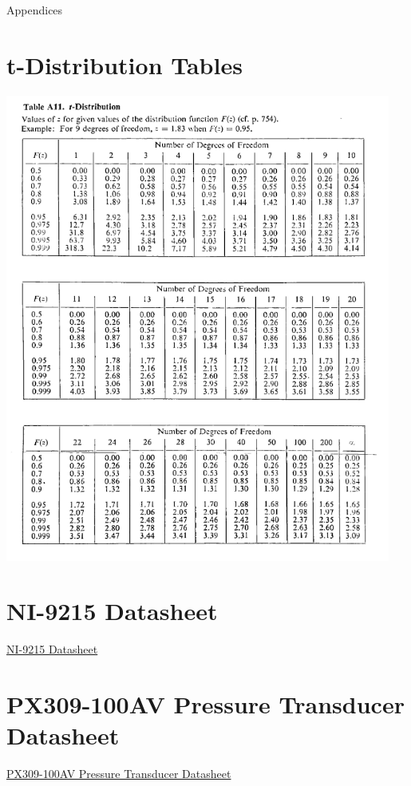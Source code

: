 \documentclass{article}
\begin{document}
\newpage
\thispagestyle{empty}  %
\begin{center}
	\vspace*{\fill}
	{\Huge Appendices}
	\vspace*{\fill}
\end{center}

\newpage
\begin{appendices}
\pagestyle{fancy}
\renewcommand{\thefigure}{A\arabic{figure}}
\setcounter{figure}{0}

\section*{t-Distribution Tables}
\hypertarget{1}{\includegraphics[width=0.95\textwidth]{t_distribution_Table_lecture3.png}}

\section*{NI-9215 Datasheet}
\href{https://www.amc-systeme.de/files/pdf/ni-9215-amc.pdf}{NI-9215 Datasheet}

\section*{PX309-100AV Pressure Transducer Datasheet}
\href{https://www.farnell.com/datasheets/2339490.pdf}{PX309-100AV Pressure Transducer Datasheet}
\end{appendices}
\end{document}
